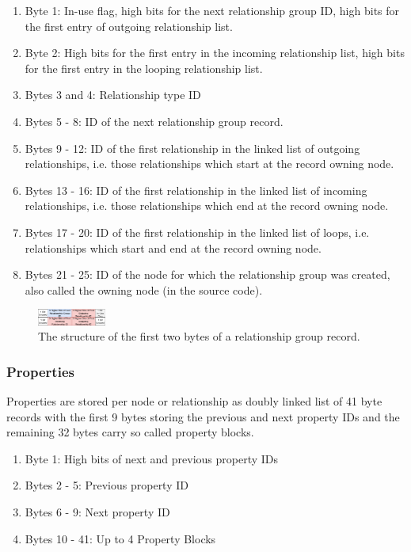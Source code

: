 \documentclass[a4paper,10pt]{article}
\begin{document}
    \begin{enumerate}
     \item Byte 1: In-use flag, high bits for the next relationship group ID, high bits for the first entry of outgoing relationship list.
     \item Byte 2: High bits for the first entry in the incoming relationship list, high bits for the first entry in the looping relationship list.
     \item Bytes 3 and 4: Relationship type ID
     \item Bytes 5 - 8: ID of the next relationship group record.
     \item Bytes 9 - 12: ID of the first relationship in the linked list of outgoing relationships, i.e. those relationships which start at the record owning node.
     \item Bytes 13 - 16: ID of the first relationship in the linked list of incoming relationships, i.e. those relationships which end at the record owning node.
     \item Bytes 17 - 20: ID of the first relationship in the linked list of loops, i.e. relationships which start and end at the record owning node.
     \item Bytes 21 - 25: ID of the node for which the relationship group was created, also called the owning node (in the source code).
    \end{enumerate}
    
    \begin{figure}[htp]\label{rel_group_first_bytes}
        \begin{center}
            \includegraphics[keepaspectratio,height=0.2\textheight,width=0.2\textwidth]{img/03_record/relationship/relationship_group_first_bytes.png}
        \end{center}
        \caption{The structure of the first two bytes of a relationship group record.} %
    \end{figure}
    

    \subsubsection{Properties}
    Properties are stored per node or relationship as doubly linked list of 41 byte records with the first 9 bytes storing the previous and next property IDs and the remaining 32 bytes carry so called property blocks.
    \begin{enumerate}
     \item Byte 1: High bits of next and previous property IDs
     \item Bytes 2 - 5: Previous property ID
     \item Bytes 6 - 9: Next property ID
     \item Bytes 10 - 41: Up to 4 Property Blocks
    \end{enumerate}
    
\end{document}
